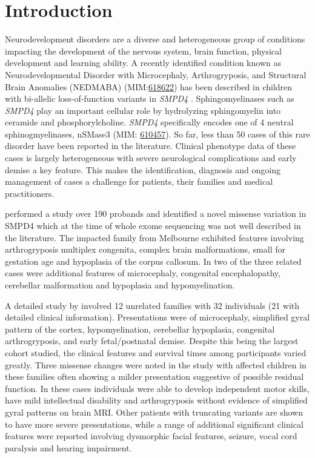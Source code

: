 \documentclass[
  authoryear,
  preprint,
  3p]{elsarticle}
\begin{document}
\hypertarget{introduction}{%
\section{Introduction}\label{introduction}}

Neurodevelopment disorders are a diverse and heterogeneous group of
conditions impacting the development of the nervous system, brain
function, physical development and learning ability. A recently
identified condition known as Neurodevelopmental Disorder with
Microcephaly, Arthrogryposis, and Structural Brain Anomalies (NEDMABA)
(MIM:\href{https://omim.org/entry/618622}{618622}) has been described in
children with bi-allelic loss-of-function variants in \emph{SMPD4}
\citep{magini2019loss}. Sphingomyelinases such as \emph{SMPD4} play an
important cellular role by hydrolyzing sphingomyelin into ceramide and
phosphorylcholine. \emph{SMPD4} specifically encodes one of 4 neutral
sphinogmyelinases, nSMase3 (MIM:
\href{http://omim.org/entry/610457}{610457}). So far, less than 50 cases
of this rare disorder have been reported in the literature. Clinical
phenotype data of these cases is largely heterogeneous with severe
neurological complications and early demise a key feature. This makes
the identification, diagnosis and ongoing management of cases a
challenge for patients, their families and medical practitioners.

\citet{ravenscroft2021neurogenetic} performed a study over 190 probands
and identified a novel missense variation in SMPD4 which at the time of
whole exome sequencing was not well described in the literature. The
impacted family from Melbourne exhibited features involving
arthrogryposis multiplex congenita, complex brain malformations, small
for gestation age and hypoplasia of the corpus callosum. In two of the
three related cases were additional features of microcephaly, congenital
encephalopathy, cerebellar malformation and hypoplasia and
hypomyelination.

A detailed study by \citet{magini2019loss} involved 12 unrelated
families with 32 individuals (21 with detailed clinical information).
Presentations were of microcephaly, simplified gyral pattern of the
cortex, hypomyelination, cerebellar hypoplasia, congenital
arthrogryposis, and early fetal/postnatal demise. Despite this being the
largest cohort studied, the clinical features and survival times among
participants varied greatly. Three missense changes were noted in the
study with affected children in these families often showing a milder
presentation suggestive of possible residual function. In these cases
individuals were able to develop independent motor skills, have mild
intellectual disability and arthrogryposis without evidence of
simplified gyral patterns on brain MRI. Other patients with truncating
variants are shown to have more severe presentations, while a range of
additional significant clinical features were reported involving
dysmorphic facial features, seizure, vocal cord paralysis and hearing
impairment.
\end{document}
